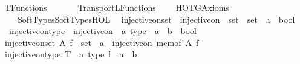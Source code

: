 %
\begin{isabellebody}%
%
%
\isadelimdocument
%
\endisadelimdocument
%
\isatagdocument
%
\isamarkuptrue%
%
\endisatagdocument
{\isafolddocument}%
%
\isadelimdocument
%
\endisadelimdocument
%
\isadelimtheory
%
\endisadelimtheory
%
\isatagtheory
{}\isamarkupfalse%
\ TFunctions\isanewline
\ \ \isanewline
\ \ \ \ Transport{\isachardot}{\kern0pt}LFunctions\isanewline
\ \ \ \ HOTG{\isachardot}{\kern0pt}Axioms\isanewline
\ \ \ \ Soft{\isacharunderscore}{\kern0pt}Types{\isachardot}{\kern0pt}Soft{\isacharunderscore}{\kern0pt}Types{\isacharunderscore}{\kern0pt}HOL\isanewline
{}%
\endisatagtheory
{\isafoldtheory}%
%
\isadelimtheory
\isanewline
%
\endisadelimtheory
\isanewline
{}\isamarkupfalse%
\isanewline
\ \ injective{\isacharunderscore}{\kern0pt}on{\isacharunderscore}{\kern0pt}set\ {\isasymequiv}\ {\isachardoublequoteopen}injective{\isacharunderscore}{\kern0pt}on\ {\isacharcolon}{\kern0pt}{\isacharcolon}{\kern0pt}\ set\ {\isasymRightarrow}\ {\isacharparenleft}{\kern0pt}set\ {\isasymRightarrow}\ {\isacharprime}{\kern0pt}a{\isacharparenright}{\kern0pt}\ {\isasymRightarrow}\ bool{\isachardoublequoteclose}\isanewline
\ \ injective{\isacharunderscore}{\kern0pt}on{\isacharunderscore}{\kern0pt}type\ {\isasymequiv}\ {\isachardoublequoteopen}injective{\isacharunderscore}{\kern0pt}on\ {\isacharcolon}{\kern0pt}{\isacharcolon}{\kern0pt}\ {\isacharprime}{\kern0pt}a\ type\ {\isasymRightarrow}\ {\isacharparenleft}{\kern0pt}{\isacharprime}{\kern0pt}a\ {\isasymRightarrow}\ {\isacharprime}{\kern0pt}b{\isacharparenright}{\kern0pt}\ {\isasymRightarrow}\ bool{\isachardoublequoteclose}\isanewline
{}\isanewline
\ \ \isamarkupfalse%
\ {\isachardoublequoteopen}injective{\isacharunderscore}{\kern0pt}on{\isacharunderscore}{\kern0pt}set\ A\ {\isacharparenleft}{\kern0pt}f\ {\isacharcolon}{\kern0pt}{\isacharcolon}{\kern0pt}\ set\ {\isasymRightarrow}\ {\isacharprime}{\kern0pt}a{\isacharparenright}{\kern0pt}\ {\isasymequiv}\ injective{\isacharunderscore}{\kern0pt}on\ {\isacharparenleft}{\kern0pt}mem{\isacharunderscore}{\kern0pt}of\ A{\isacharparenright}{\kern0pt}\ f{\isachardoublequoteclose}\isanewline
\ \ \isamarkupfalse%
\ {\isachardoublequoteopen}injective{\isacharunderscore}{\kern0pt}on{\isacharunderscore}{\kern0pt}type\ {\isacharparenleft}{\kern0pt}T\ {\isacharcolon}{\kern0pt}{\isacharcolon}{\kern0pt}\ {\isacharprime}{\kern0pt}a\ type{\isacharparenright}{\kern0pt}\ {\isacharparenleft}{\kern0pt}f\ {\isacharcolon}{\kern0pt}{\isacharcolon}{\kern0pt}\ {\isacharprime}{\kern0pt}a\ {\isasymRightarrow}\ {\isacharprime}{\kern0pt}b{\isacharparenright}{\kern0pt}\ {\isasymequiv}\isanewline

\end{isabellebody}
